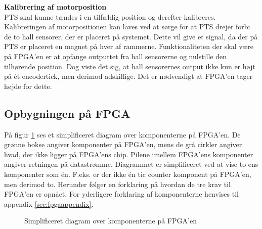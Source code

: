 \textbf{Kalibrering af motorposition}\\
PTS skal kunne tændes i en tilfældig position og derefter kalibreres.
Kalibreringen af motorpositionen kan laves ved at sørge for at PTS drejer forbi 
de to hall sensorer, der er placeret på systemet. Dette vil give et signal, da 
der på PTS er placeret en magnet på hver af rammerne.
Funktionaliteten der skal være på FPGA'en er at opfange outputtet fra 
hall sensorerne og nulstille den tilhørende position.
Dog viste det sig, at hall sensorernes output ikke kun er højt på ét encodertick, 
men derimod adskillige. Det er nødvendigt at FPGA'en tager højde for 
dette.

\subsection{Opbygningen på FPGA}
På figur \ref{fig:FPGA_blok} ses et simplificeret diagram over komponenterne på FPGA'en. 
De grønne bokse angiver komponenter på FPGA'en, mens de grå cirkler angiver hvad, der ikke ligger på 
FPGA'ens chip. Pilene imellem FPGA'ens komponenter angiver retningen på 
datastrømme. Diagrammet er simplificeret ved at vise to ens komponenter som én. 
F.eks. er der ikke én tic counter komponent på FPGA'en, men derimod to.
Herunder følger en forklaring på hvordan de tre krav til FPGA'en er opnået. For 
yderligere forklaring af komponenterne henvises til appendix 
\ref{sec:fpgaappendix}.

\begin{figure}[!th]
\centering
\begin{tikzpicture}[node distance = 5 cm,scale=1]

\end{tikzpicture}
\caption[Diagram over FPGA komponenter]{Simplificeret diagram over komponenterne på FPGA'en}
\label{fig:FPGA_blok}
\end{figure}

